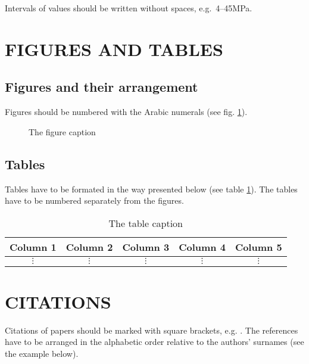 \documentclass[11pt,twoside]{article}
\begin{document}
 \noindent
 Intervals of values should be written without spaces, e.g.\ 4--45MPa.


\section{FIGURES AND TABLES}

\subsection{Figures and their arrangement}

 Figures should be numbered with the Arabic numerals (see fig. 
 \ref{fig-example}). 

 \begin{figure}[hbtp]
  \fbox{\rule{0mm}{45mm}\rule{85mm}{0mm}}
  \caption{The figure caption}
  \label{fig-example}
 \end{figure}

\subsection{Tables}

 Tables have to be formated in the way presented below (see table 
 \ref{tab-example}). The tables have to be numbered  separately from 
 the figures.

 \begin{table}[hbtp]
  \caption{The table caption}
   \label{tab-example}
   \begin{tabular}{|c|c|c|c|c|}\hline
       Column 1 & Column 2 & Column 3 &  Column 4 & Column 5\\ \hline
       $\vdots$ & $\vdots$ & $\vdots$ & $\vdots$ & $\vdots$\\ \hline
    \end{tabular}
 \end{table}

\section{CITATIONS}

Citations of papers should be marked  with square brackets, e.g.
\cite{Ming}. The references have to be arranged in 
the alphabetic order relative to the authors' surnames (see the example
below).
\end{document}
